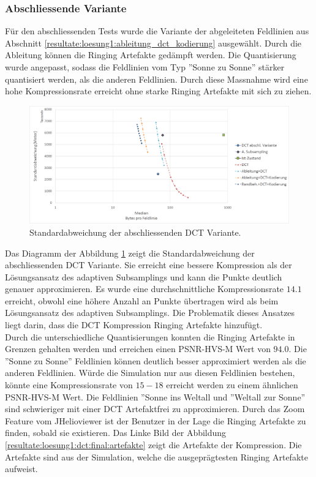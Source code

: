 \subsubsection{Abschliessende Variante}
Für den abschliessenden Tests wurde die Variante der abgeleiteten Feldlinien aus Abschnitt \ref{resultate:loesung1:ableitung_dct_kodierung} ausgewählt. Durch die Ableitung können die Ringing Artefakte gedämpft werden. Die Quantisierung wurde angepasst, sodass die Feldlinien vom Typ ''Sonne zu Sonne'' stärker quantisiert werden, als die anderen Feldlinien. Durch diese Massnahme wird eine hohe Kompressionsrate erreicht ohne starke Ringing Artefakte mit sich zu ziehen.
\begin{figure}[!htbp]
	\center	\includegraphics[width=1\textwidth,keepaspectratio]{./pictures/resultate/loesung1/loesung1-12/resultate.png}
	\caption{Standardabweichung der abschliessenden DCT Variante.}	\label{resultate:loesung1:dct:abschliessend:standardabweichung}
\end{figure} 
Das Diagramm der Abbildung \ref{resultate:loesung1:dct:abschliessend:standardabweichung} zeigt die Standardabweichung der abschliessenden DCT Variante. Sie erreicht eine bessere Kompression als der Lösungsansatz des adaptiven Subsamplings und kann die Punkte deutlich genauer approximieren. Es wurde eine durchschnittliche Kompressionsrate $14.1$ erreicht, obwohl eine höhere Anzahl an Punkte übertragen wird als beim Lösungsansatz des adaptiven Subsamplings. Die Problematik dieses Ansatzes liegt darin, dass die DCT Kompression Ringing Artefakte hinzufügt.\\
Durch die unterschiedliche Quantisierungen konnten die Ringing Artefakte in Grenzen gehalten werden und erreichen einen PSNR-HVS-M  Wert von $94.0$. Die ''Sonne zu Sonne'' Feldlinien können deutlich besser approximiert werden als die anderen Feldlinien. Würde die Simulation nur aus diesen Feldlinien bestehen, könnte eine Kompressionsrate von $15-18$ erreicht werden zu einem ähnlichen PSNR-HVS-M Wert. Die Feldlinien ''Sonne ins Weltall und ''Weltall zur Sonne'' sind schwieriger mit einer DCT Artefaktfrei zu approximieren.  Durch das Zoom Feature vom JHelioviewer ist der Benutzer in der Lage die Ringing Artefakte zu finden, sobald sie existieren. Das Linke Bild der Abbildung \ref{resultate:loesung1:dct:final:artefakte} zeigt die Artefakte der Kompression. Die Artefakte sind aus der Simulation, welche die ausgeprägtesten Ringing Artefakte aufweist.
